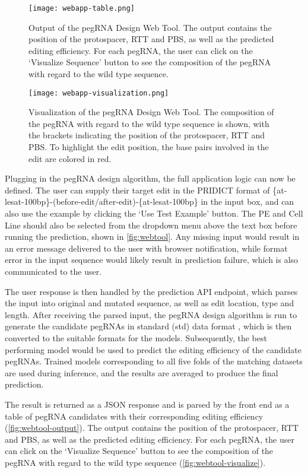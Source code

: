 \begin{figure}
    \centering
    \texttt{[image: webapp-table.png]}
    \caption[pegRNA Design Web Tool Output]{Output of the pegRNA Design Web Tool. The output contains the position of the protospacer, RTT and PBS, as well as the predicted editing efficiency. For each pegRNA, the user can click on the `Visualize Sequence' button to see the composition of the pegRNA with regard to the wild type sequence.}
    \label{fig:webtool-output}
\end{figure}

\begin{figure}
    \centering
    \texttt{[image: webapp-visualization.png]}
    \caption[pegRNA Design Web Tool Visualization]{Visualization of the pegRNA Design Web Tool. The composition of the pegRNA with regard to the wild type sequence is shown, with the brackets indicating the position of the protospacer, RTT and PBS. To highlight the edit position, the base pairs involved in the edit are colored in red.}
    \label{fig:webtool-visualize}
\end{figure}


Plugging in the pegRNA design algorithm, the full application logic can now be defined.
The user can supply their target edit in the PRIDICT format of \{at-lesat-100bp\}-(before-edit/after-edit)-\{at-lesat-100bp\} in the input box, and can also use the example by clicking the `Use Test Example' button. The PE and Cell Line should also be selected from the dropdown menu above the text box before running the prediction, shown in \autoref{fig:webtool}. Any missing input would result in an error message delivered to the user with browser notification, while format error in the input sequence would likely result in prediction failure, which is also communicated to the user.

The user response is then handled by the prediction API endpoint, which parses the input into original and mutated sequence, as well as edit location, type and length. After receiving the parsed input, the pegRNA design algorithm is run to generate the candidate pegRNAs in standard (std) data format
, which is then converted to the suitable formats for the models. Subsequently, the best performing model would be used to predict the editing efficiency of the candidate pegRNAs. Trained models corresponding to all five folds of the matching datasets are used during inference, and the results are averaged to produce the final prediction. 

The result is returned as a JSON response and is parsed by the front end as a table of pegRNA candidates with their corresponding editing efficiency (\autoref{fig:webtool-output}). The output contains the position of the protospacer, RTT and PBS, as well as the predicted editing efficiency. For each pegRNA, the user can click on the `Visualize Sequence' button to see the composition of the pegRNA with regard to the wild type sequence (\autoref{fig:webtool-visualize}).

